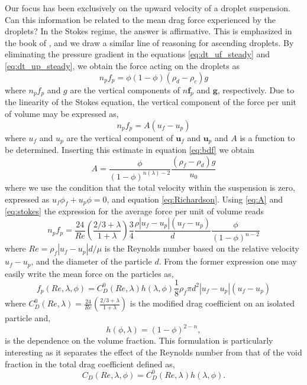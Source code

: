 Our focus has been exclusively on the upward velocity of a droplet suspension. 
Can this information be related to the mean drag force experienced by the droplets? In the Stokes regime, the answer is affirmative. This is emphasized in the book of \citep{jackson2000}, and we draw a similar line of reasoning for ascending droplets. By eliminating the pressure gradient in the equations \ref{eq:dt_uf_steady} and \ref{eq:dt_up_steady}, we obtain the force acting on the droplets as
\begin{equation}
n_pf_p = \phi(1-\phi)(\rho_d -\rho _c)g
\label{eq:bdf}
\end{equation}
where $n_pf_p$ and $g$ are the vertical components of $n\textbf{f}_p$ and $\textbf{g}$, respectively. 
Due to the linearity of the Stokes equation, the vertical component of the force per unit of volume may be expressed as, 
\begin{equation}
    n_pf_p = A (u_f -u_p)
    \label{eq:stokes}
\end{equation}
where $u_f$ and $u_p$ are the vertical component of $\textbf{u}_f$ and $\textbf{u}_p$ and $A$ is a function to be determined. 
Inserting this estimate in equation \ref{eq:bdf} we obtain 
\begin{equation}
    A = \frac{\phi}{(1-\phi)^{n(\lambda)-2}} \frac{(\rho_f -\rho_d)g}{u_0} 
    \label{eq:A}
\end{equation}
where we use the condition that the total velocity within the suspension is zero, expressed as $u_f \phi_f + u_p \phi =0$, and equation \ref{eq:Richardson}. 
Using \ref{eq:A} and \ref{eq:stokes} the expression for the average force per unit of volume reads
\begin{equation}
n_pf_p = \frac{24}{Re}\left(\frac{2/3+\lambda}{1+\lambda}\right)\frac{3}{4}\frac{\rho |u_f-u_p|(u_f-u_p)}{d}\frac{\phi}{(1-\phi)^{n-2}}
\end{equation}
where $Re = \rho_f |u_f-u_p| d/\mu$ is the Reynolds number based on the relative velocity $u_f-u_p$, and the diameter of the particle $d$. 
From the former expression one may easily write the mean force on the particles as,
\begin{equation}
f_p (Re,\lambda,\phi) = C_D^0(Re,\lambda)h(\lambda,\phi)\frac{1}{8}\rho_f \pi d^2 |u_f-u_p|(u_f-u_p)
\label{eq:FCD}
\end{equation}
where $C_D^0(Re,\lambda)=\frac{24}{Re}\left(\frac{2/3+\lambda}{1+\lambda}\right)$ is the modified drag coefficient on an isolated particle and,
\begin{equation}
    h(\phi,\lambda) = (1-\phi)^{2-n},
    \label{eq:h_stokes}
\end{equation} 
is the dependence on the volume fraction. 
This formulation is particularly interesting as it separates the effect of the Reynolds number from that of the void fraction in the total drag coefficient defined as,
\begin{equation}
    C_D(Re,\lambda,\phi) = C_D^0(Re,\lambda)h(\lambda,\phi).
    \label{eq:C_d_final}
\end{equation}

